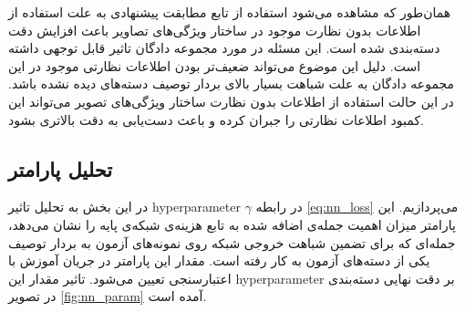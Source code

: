 همان‌طور که مشاهده می‌شود استفاده از تابع مطابقت پیشنهادی به علت استفاده از اطلاعات بدون نظارت موجود در ساختار ویژگی‌های تصاویر باعث افزایش دقت دسته‌بندی شده است. این مسئله در مورد مجموعه دادگان  تاثیر قابل توجهی داشته است. دلیل این موضوع می‌تواند ضعیف‌تر بودن اطلاعات نظارتی موجود در این مجموعه دادگان به علت شباهت بسیار بالای بردار توصیف دسته‌های دیده نشده باشد. در این حالت استفاده از اطلاعات بدون نظارت ساختار ویژگی‌های تصویر می‌تواند این کمبود اطلاعات نظارتی را جبران کرده و باعث دست‌یابی به دقت بالاتری بشود.
\subsection{تحلیل پارامتر}\label{exp:nn_params}
در این بخش به تحلیل تاثیر \gls{hyperparameter} $\gamma$ در رابطه \eqref{eq:nn_loss} می‌پردازیم. این پارامتر میزان اهمیت جمله‌ی اضافه شده به تابع هزینه‌ی  شبکه‌ی پایه را نشان می‌دهد، جمله‌ای  که برای تضمین شباهت خروجی شبکه روی نمونه‌های آزمون به بردار توصیف یکی از دسته‌های آزمون به کار  رفته است. مقدار این پارامتر در جریان آموزش با اعتبارسنجی تعیین می‌شود. تاثیر مقدار این \gls{hyperparameter} بر دقت نهایی دسته‌بندی در تصویر
\ref{fig:nn_param}
آمده است.

